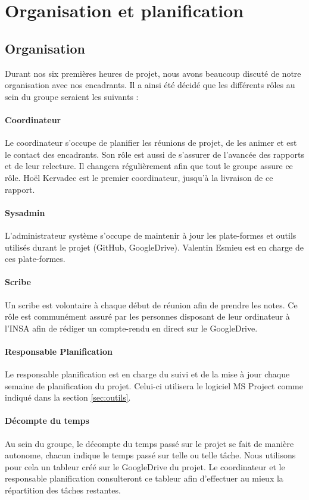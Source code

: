 \section{Organisation et planification}
	\subsection{Organisation}
	    Durant nos six premières heures de projet, nous avons beaucoup discuté de notre organisation avec nos encadrants. Il a ainsi été décidé que les différents rôles au sein du groupe seraient les suivants :
	    \paragraph{Coordinateur} Le coordinateur s'occupe de planifier les réunions de projet, de les animer et est le contact des encadrants. Son rôle est aussi de s'assurer de l'avancée des rapports et de leur relecture. Il changera régulièrement afin que tout le groupe assure ce rôle. Hoël Kervadec est le premier coordinateur, jusqu'à la livraison de ce rapport.
	    \paragraph{Sysadmin} L'administrateur système s'occupe de maintenir à jour les plate-formes et outils utilisés durant le projet (GitHub, GoogleDrive). Valentin Esmieu est en charge de ces plate-formes.
	    \paragraph{Scribe} Un scribe est volontaire à chaque début de réunion afin de prendre les notes. Ce rôle est communément assuré par les personnes disposant de leur ordinateur à l'INSA afin de rédiger un compte-rendu en direct sur le GoogleDrive.
	    \paragraph{Responsable Planification} Le responsable planification est en charge du suivi et de la mise à jour chaque semaine de planification du projet. Celui-ci utilisera le logiciel MS Project comme indiqué dans la section \ref{sec:outils}.
	    \paragraph{Décompte du temps} Au sein du groupe, le décompte du temps passé sur le projet se fait de manière autonome, chacun indique le temps passé sur telle ou telle tâche. Nous utilisons pour cela un tableur créé sur le GoogleDrive du projet. Le coordinateur et le responsable planification consulteront ce tableur afin d'effectuer au mieux la répartition des tâches restantes.

